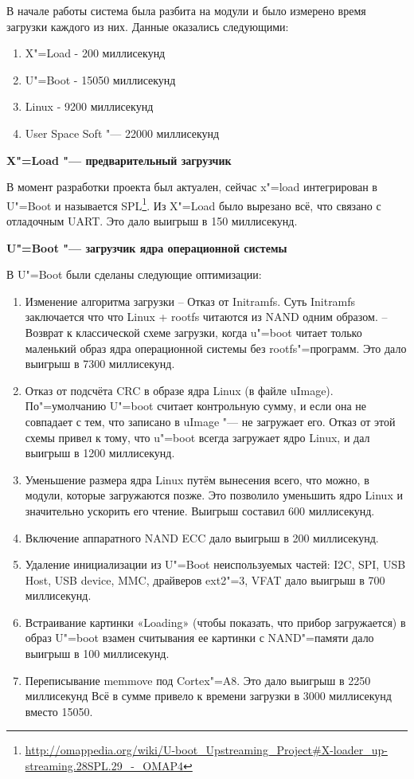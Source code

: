 \documentclass[10pt, a5paper]{article}
\begin{document}
В начале работы система была разбита на модули и было измерено время загрузки каждого из них. Данные оказались следующими:

\begin{enumerate}
  \item X"=Load	- 200 миллисекунд
  \item U"=Boot	- 15050 миллисекунд
  \item Linux	- 9200 миллисекунд
  \item User Space Soft "--- 22000 миллисекунд
\end{enumerate}

\textbf{X"=Load "--- предварительный загрузчик}

В момент разработки проекта был актуален, сейчас x"=load интегрирован в U"=Boot и называется SPL\footnote{\url{http://omappedia.org/wiki/U-boot_Upstreaming_Project#X-loader_up-streaming.28SPL.29_-_OMAP4}}.
Из X"=Load было вырезано всё, что связано с отладочным UART. Это дало выигрыш в 150 миллисекунд.

\textbf{U"=Boot "--- загрузчик ядра операционной системы}

В U"=Boot были сделаны следующие оптимизации:

\begin{enumerate}
  \item Изменение алгоритма загрузки
  -- Отказ от Initramfs. Суть Initramfs заключается что что Linux + rootfs читаются из NAND одним образом.
  -- Возврат к классической схеме загрузки, когда u"=boot читает только маленький образ ядра операционной системы без rootfs"=программ.
  Это дало выигрыш в 7300 миллисекунд.
  \item Отказ от подсчёта CRC в образе ядра Linux (в файле uImage). По"=умолчанию U"=boot считает контрольную сумму, и если она не совпадает с тем, что записано в uImage "--- не загружает его. Отказ от этой схемы привел к тому, что u"=boot всегда загружает ядро Linux, и дал выигрыш в 1200 миллисекунд.
  \item Уменьшение размера ядра Linux путём вынесения всего, что можно, в модули, которые загружаются позже. Это позволило уменьшить ядро Linux и значительно ускорить его чтение. Выигрыш составил 600 миллисекунд.
  \item Включение аппаратного NAND ECC дало выигрыш в 200 миллисекунд.
  \item Удаление инициализации из U"=Boot неиспользуемых частей: I2C, SPI, USB Host, USB device, MMC, драйверов ext2"=3, VFAT дало выигрыш в 700 миллисекунд.
  \item Встраивание картинки «Loading» (чтобы показать, что прибор загружается) в образ U"=boot взамен считывания ее картинки с NAND"=памяти дало выигрыш в 100 миллисекунд.
  \item Переписывание memmove под Cortex"=A8. Это дало выигрыш в 2250 миллисекунд
Всё в сумме привело к времени загрузки в 3000 миллисекунд вместо 15050.
\end{enumerate}
\end{document}
